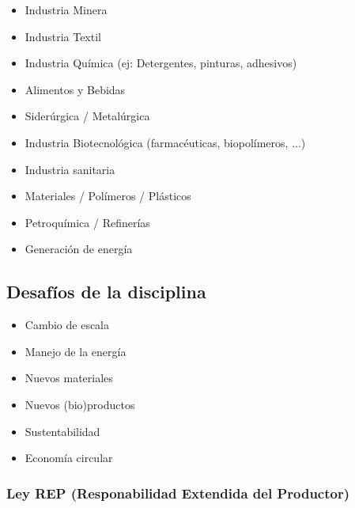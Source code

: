     \begin{multicols}{2}
        \begin{itemize}
            \item Industria Minera
            \item Industria Textil
            \item Industria Química (ej: Detergentes, pinturas, adhesivos)
            \item Alimentos y Bebidas
            \item Siderúrgica / Metalúrgica
            \item Industria Biotecnológica (farmacéuticas, biopolímeros, ...)
            \item Industria sanitaria
            \item Materiales / Polímeros / Plásticos
            \item Petroquímica / Refinerías
            \item Generación de energía
        \end{itemize}
    \end{multicols}
    
    \subsection{Desafíos de la disciplina}
    
    \begin{multicols}{2}
        \begin{itemize}
            \item Cambio de escala
            \item Manejo de la energía
            \item Nuevos materiales
            \item Nuevos (bio)productos
            \item Sustentabilidad
            \item Economía circular
        \end{itemize}
    \end{multicols}
    
        \subsubsection{Ley REP (Responabilidad Extendida del Productor)}
        
        \begin{quote}
            \textit{}
        \end{quote}
        
